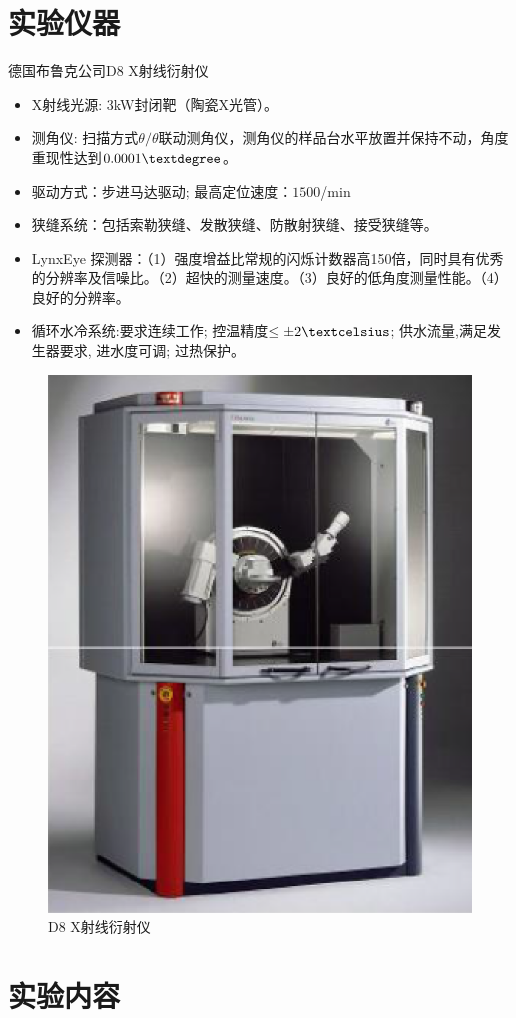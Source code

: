 \documentclass[a4paper]{article}
\begin{document}
\section{实验仪器}
德国布鲁克公司D8 X射线衍射仪
\begin{itemize}
	\item X射线光源: 3kW封闭靶（陶瓷X光管）。
	\item 测角仪: 扫描方式$ \theta/\theta $联动测角仪，测角仪的样品台水平放置并保持不动，角度重现性达到$ 0.0001\textdegree $。
	\item 驱动方式：步进马达驱动; 最高定位速度：$ 1500 $\textdegree/min
	\item 狭缝系统：包括索勒狭缝、发散狭缝、防散射狭缝、接受狭缝等。
	\item LynxEye 探测器：（1）强度增益比常规的闪烁计数器高150倍，同时具有优秀的分辨率及信噪比。（2）超快的测量速度。（3）良好的低角度测量性能。（4）良好的分辨率。
	\item 循环水冷系统:要求连续工作; 控温精度$ \leq \pm 2\textcelsius $; 供水流量,满足发生器要求, 进水度可调; 过热保护。
\end{itemize}
\begin{figure}[H]
	\centering
	\includegraphics[width=0.55\linewidth]{fig/D8.png}
	\caption{D8 X射线衍射仪}
\end{figure}

\section{实验内容}
\end{document}
